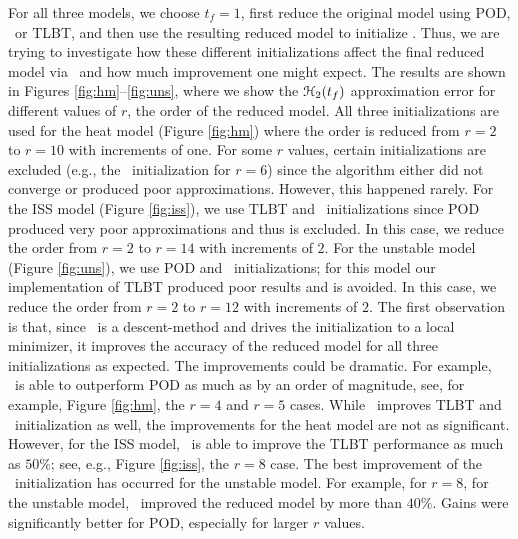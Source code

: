 \documentclass[twocolumn]{autart}
\begin{document}
For all three models, we choose $t_f = 1$, first reduce the original model using POD, \goyal \  or TLBT, and then use the resulting reduced model  to initialize \FH. Thus, we are trying to investigate how these different initializations affect the final reduced model via  \FH \ and how much improvement one might expect.
The results are shown in Figures \ref{fig:hm}--\ref{fig:uns},  where we show the $\EuScript{H}_2(t_f)$ approximation error for different values of $r$, the order of the reduced model.
  All three initializations are used for the heat model (Figure \ref{fig:hm}) where the order is reduced from $r=2$ to $r=10$ with increments of one. For some $r$ values, certain initializations are excluded (e.g., the \goyal \ initialization for $r=6$) since the algorithm either did not converge or produced  poor approximations. However, this happened rarely. For the ISS model (Figure \ref{fig:iss}), we use  TLBT and \goyal \ initializations since  POD produced very poor approximations and thus is excluded. In this case, we reduce the order from $r=2$ to $r=14$ with increments of $2$. For the unstable model (Figure \ref{fig:uns}), we use POD and \goyal \ initializations; for this model our implementation of TLBT produced  poor results and is avoided. In this case,  we reduce the order from $r=2$ to $r=12$ with increments of $2$.  
 The first observation is that,  since  \FH \ is a descent-method and drives the initialization to a local minimizer,  it improves the accuracy of  the reduced model for all three initializations as expected. The improvements could be dramatic. For example, 
 \FH \ is able to outperform POD as much as by an order of magnitude, see, for example,
 Figure \ref{fig:hm}, the  $r=4$ and $r=5$ cases. 
 While \FH \ improves TLBT and \goyal\ initialization as well, the improvements for the heat model are not as significant. However, for the ISS model,
\FH \ is able to improve the TLBT performance as much as $50\%$; see, e.g., Figure \ref{fig:iss}, the $r=8$ case. 
The best improvement of the \goyal \ initialization has occurred for the unstable model. For example, for $r=8$, for the unstable model, \FH\ improved the reduced model by more than $40 \%$. Gains were significantly better for POD, especially for larger $r$ values. 
 
\end{document}
